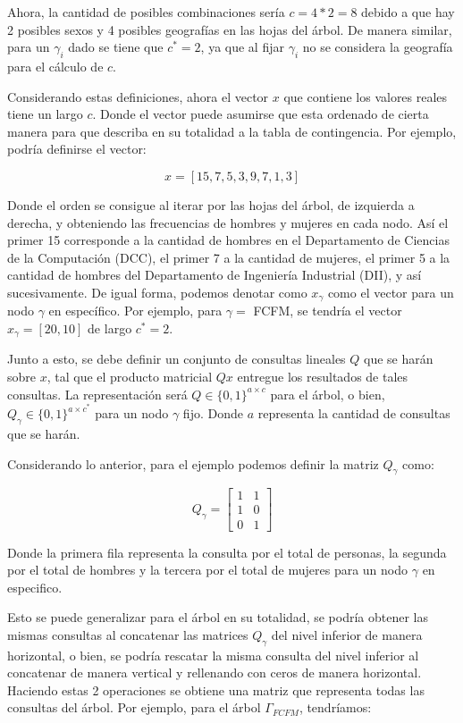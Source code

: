 \documentclass[informe]{upropuesta}
\begin{document}
Ahora, la cantidad de posibles combinaciones sería $c = 4 * 2 = 8$ debido a que hay 2 posibles sexos y 4 posibles geografías en las hojas del árbol. De manera similar, para un $\gamma_i$ dado se tiene que $c^* = 2$, ya que al fijar $\gamma_i$ no se considera la geografía para el cálculo de $c$. 

Considerando estas definiciones, ahora el vector $x$ que contiene los valores reales tiene un largo $c$. Donde el vector puede asumirse que esta ordenado de cierta manera para que describa en su totalidad a la tabla de contingencia. Por ejemplo, podría definirse el vector:

$$x = [15, 7, 5, 3, 9, 7, 1, 3]$$

Donde el orden se consigue al iterar por las hojas del árbol, de izquierda a derecha, y obteniendo las frecuencias de hombres y mujeres en cada nodo. Así el primer 15 corresponde a la cantidad de hombres en el Departamento de Ciencias de la Computación (DCC), el primer 7 a la cantidad de mujeres, el primer 5 a la cantidad de hombres del Departamento de Ingeniería Industrial (DII), y así sucesivamente. De igual forma, podemos denotar como $x_{\gamma}$ como el vector para un nodo $\gamma$ en específico. Por ejemplo, para $\gamma = $ FCFM, se tendría el vector $x_{\gamma} = [20, 10]$ de largo $c^* = 2$.

Junto a esto, se debe definir un conjunto de consultas lineales $Q$ que se harán sobre $x$, tal que el producto matricial $Qx$ entregue los resultados de tales consultas. La representación será $Q \in \{0, 1\}^{a \times c}
$ para el árbol, o bien, $Q_{\gamma} \in \{0, 1\}^{a \times c^*}$ para un nodo $\gamma$ fijo. Donde $a$ representa la cantidad de consultas que se harán.

Considerando lo anterior, para el ejemplo podemos definir la matriz $Q_{\gamma}$ como: 

$$
Q_{\gamma} = \begin{bmatrix}
    1 & 1 \\
    1 & 0 \\
    0 & 1
\end{bmatrix}
$$

Donde la primera fila representa la consulta por el total de personas, la segunda por el total de hombres y la tercera por el total de mujeres para un nodo $\gamma$ en especifico. 

Esto se puede generalizar para el árbol en su totalidad, se podría obtener las mismas consultas al concatenar las matrices $Q_{\gamma}$ del nivel inferior de manera horizontal, o bien, se podría rescatar la misma consulta del nivel inferior al concatenar de manera vertical y rellenando con ceros de manera horizontal. Haciendo estas 2 operaciones se obtiene una matriz que representa todas las consultas del árbol. Por ejemplo, para el árbol $\Gamma_{FCFM}$, tendríamos:
\end{document}
